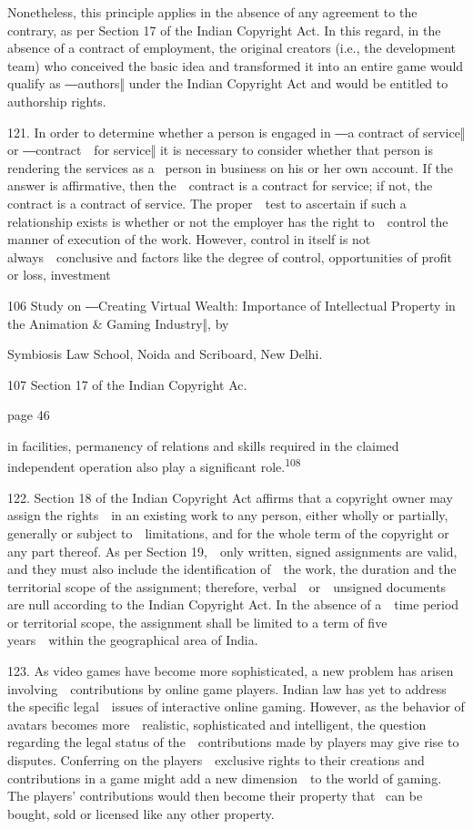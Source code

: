 \documentclass[
]{article}
\begin{document}
{Nonetheless, this principle applies in the absence of any agreement to
the contrary, as per Section 17 of the Indian }{Copyright Act}{. In this
regard, in the absence of a contract of employment, the original
creators (i.e., the development team) who conceived the basic }{idea and
transformed it into an entire game would qualify as ―authors‖ under the
Indian }{Copyright Act }{and would be entitled to authorship rights.}

{121. }{In order to determine whether a person is engaged in ―a contract
of service‖ or ―contract~~for service‖ it is necessary to consider
whether that person is rendering the services as a }{~person in business
on his or her own account. If the answer is affirmative, then
the~~contract is a contract }{for }{service; if not, the contract is a
contract }{of }{service. The proper~~test to ascertain if such a
relationship exists is whether or not the employer has the right
to~~control the manner of execution of the work. However, }{control }{in
itself is not always~~conclusive and factors like the degree of control,
opportunities of profit or loss, investment}

{106 }{Study on }{―Creating Virtual Wealth: Importance of Intellectual
Property in the Animation \& Gaming Industry‖}{, by}

{Symbiosis Law School, Noida and Scriboard, New Delhi.}

{107 }{Section 17 of the Indian }{Copyright Ac}{.}

{page 46}

{in facilities, permanency of relations and skills required in the
claimed independent operation also play a significant
role.}\textsuperscript{{108}}

{122. }{Section 18 of the Indian }{Copyright Act }{affirms that a
copyright owner may assign the rights~~in an existing work to any
person, either wholly or partially, generally or subject
to~~limitations, and for the whole term of the copyright or any part
thereof. As per Section 19,~~only written, signed assignments are valid,
and they must also include the identification of~~the work, the duration
and the territorial scope of the assignment; therefore,
verbal~~or~~unsigned documents are null according to the Indian
}{Copyright Act}{. In the absence of a~~time period or territorial
scope, the assignment shall be limited to a term of five years~~within
the geographical area of India.}

{123. }{As video games have become more sophisticated, a new problem has
arisen involving~~contributions by online game players. Indian law has
yet to address the specific legal~~issues of interactive online gaming.
However, as the behavior of avatars becomes more~~realistic,
sophisticated and intelligent, the question regarding the legal status
of the~~contributions made by players may give rise to disputes.
Conferring on the players~~exclusive rights to their creations and
contributions in a game might add a new dimension~~to the world of
gaming. }{The players' contributions would then become their property
that }{~can be bought, sold or licensed like any other property.}
\end{document}
